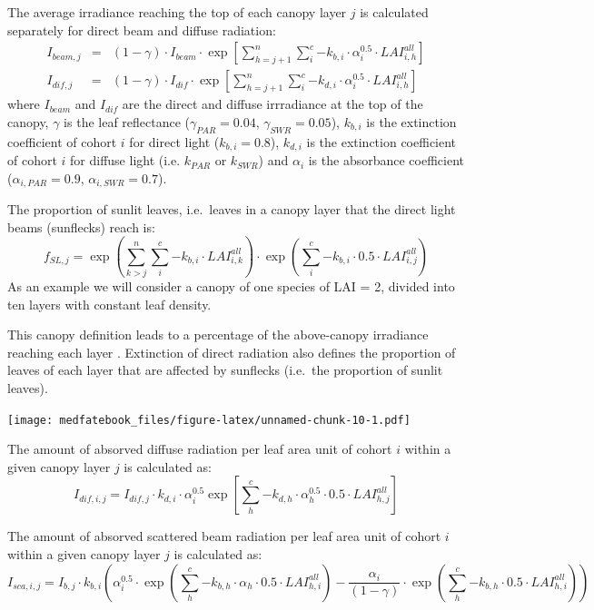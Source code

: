 \documentclass[]{book}
\begin{document}
The average irradiance reaching the top of each canopy layer \(j\) is calculated separately for direct beam and diffuse radiation:
\begin{eqnarray}
I_{beam,j} &=& (1 - \gamma) \cdot I_{beam} \cdot \exp\left[ \sum_{h=j+1}^{n}{\sum_{i}^{c}{-k_{b,i}\cdot \alpha_i^{0.5}\cdot LAI^{all}_{i,h}}}\right]\\
I_{dif,j} &=& (1 - \gamma) \cdot I_{dif} \cdot \exp\left[ \sum_{h=j+1}^{n}{\sum_{i}^{c}{-k_{d,i}\cdot \alpha_i^{0.5}\cdot LAI^{all}_{i,h}}}\right]
\end{eqnarray}
where \(I_{beam}\) and \(I_{dif}\) are the direct and diffuse irrradiance at the top of the canopy, \(\gamma\) is the leaf reflectance (\(\gamma_{PAR} = 0.04\), \(\gamma_{SWR} = 0.05\)), \(k_{b,i}\) is the extinction coefficient of cohort \(i\) for direct light (\(k_{b,i} = 0.8\)), \(k_{d,i}\) is the extinction coefficient of cohort \(i\) for diffuse light (i.e. \(k_{PAR}\) or \(k_{SWR}\)) and \(\alpha_i\) is the absorbance coefficient (\(\alpha_{i,PAR} = 0.9\), \(\alpha_{i,SWR} = 0.7\)).

The proportion of sunlit leaves, i.e.~leaves in a canopy layer that the direct light beams (sunflecks) reach is:
\begin{equation}
f_{SL, j}  = \exp\left( \sum_{k>j}^{n}{\sum_{i}^{c}{-k_{b,i} \cdot LAI^{all}_{i,k}}}\right) \cdot \exp\left( \sum_{i}^{c}{-k_{b,i} \cdot 0.5\cdot LAI^{all}_{i,j}}\right)
\end{equation}
As an example we will consider a canopy of one species of LAI = 2, divided into ten layers with constant leaf density.

This canopy definition leads to a percentage of the above-canopy irradiance reaching each layer \citep{Anten2016}. Extinction of direct radiation also defines the proportion of leaves of each layer that are affected by sunflecks (i.e.~the proportion of sunlit leaves).

\texttt{[image: medfatebook\_files/figure-latex/unnamed-chunk-10-1.pdf]}

The amount of absorved diffuse radiation per leaf area unit of cohort \(i\) within a given canopy layer \(j\) is calculated as:
\begin{equation}
I_{dif,i,j} = I_{dif,j} \cdot k_{d,i} \cdot \alpha_i^{0.5} \exp\left[ \sum_{h}^{c}{-k_{d,h}\cdot \alpha_h^{0.5}\cdot 0.5\cdot LAI^{all}_{h,j}}\right]
\end{equation}

The amount of absorved scattered beam radiation per leaf area unit of cohort \(i\) within a given canopy layer \(j\) is calculated as:
\begin{equation}
I_{sca,i,j} = I_{b,j} \cdot k_{b,i} \left( \alpha_i^{0.5}\cdot \exp \left( \sum_{h}^{c}{-k_{b,h}\cdot \alpha_h\cdot 0.5\cdot LAI^{all}_{h,i}}\right) 
-\frac{\alpha_i}{(1-\gamma)}\cdot \exp\left( \sum_{h}^{c}{-k_{b,h}\cdot 0.5\cdot LAI^{all}_{h,i}}\right) \right)
\end{equation}
\end{document}

